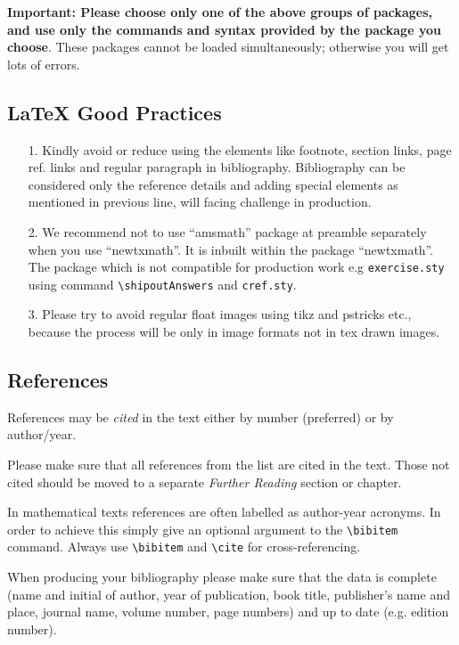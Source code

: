 \documentclass[graybox]{svmono}
\begin{document}
\noindent
\textbf{Important: Please choose only one of the above groups of packages, and use only the commands and syntax provided by the package you choose}. These packages cannot be loaded simultaneously; otherwise you will get lots of errors.


\subsection{LaTeX Good Practices}
\begin{enumerate}
\item[1.] Kindly avoid or reduce using the elements like footnote, section links, page ref. links and regular paragraph in bibliography. Bibliography can be considered only the reference details and adding special elements as mentioned in previous line, will facing challenge in production.

\item[2.] We recommend not to use ``amsmath'' package at preamble separately when you use ``newtxmath''. It is inbuilt within the package ``newtxmath''. The package which is not compatible for production work e.g \verb|exercise.sty| using command \verb|\shipoutAnswers| and \verb|cref.sty|.

\item[3.] Please try to avoid regular float images using tikz and pstricks etc., because the process will be only in image formats not in tex drawn images.
\end{enumerate}

\subsection{References}

References may be \emph{cited} in the text either by number (preferred) or by author/year.

Please make sure that all references from the list are cited in the text. Those not cited should be moved to a separate \emph{Further Reading} section or chapter.

In mathematical texts references are often labelled as author-year acronyms. In order to achieve this simply give an optional argument to the \verb|\bibitem| command. Always use \verb|\bibitem| and \verb|\cite| for cross-referencing.

When producing your bibliography please make sure that the data is complete (name and initial of author, year of publication, book title, publisher's name and place, journal name, volume number, page numbers) and up to date (e.g. edition number).
\end{document}
